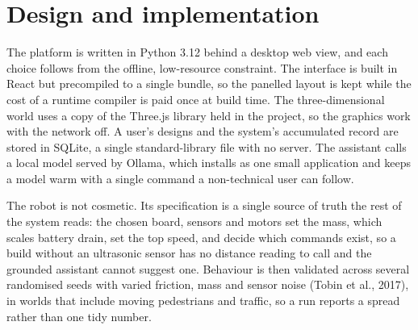 \documentclass[10.5pt]{article}
\begin{document}
\section{Design and implementation}
The platform is written in Python 3.12 behind a desktop web view, and each choice follows from the offline, low-resource constraint. The interface is built in React but precompiled to a single bundle, so the panelled layout is kept while the cost of a runtime compiler is paid once at build time. The three-dimensional world uses a copy of the Three.js library held in the project, so the graphics work with the network off. A user's designs and the system's accumulated record are stored in SQLite, a single standard-library file with no server. The assistant calls a local model served by Ollama, which installs as one small application and keeps a model warm with a single command a non-technical user can follow.

The robot is not cosmetic. Its specification is a single source of truth the rest of the system reads: the chosen board, sensors and motors set the mass, which scales battery drain, set the top speed, and decide which commands exist, so a build without an ultrasonic sensor has no distance reading to call and the grounded assistant cannot suggest one. Behaviour is then validated across several randomised seeds with varied friction, mass and sensor noise (Tobin et al., 2017), in worlds that include moving pedestrians and traffic, so a run reports a spread rather than one tidy number.
\end{document}
